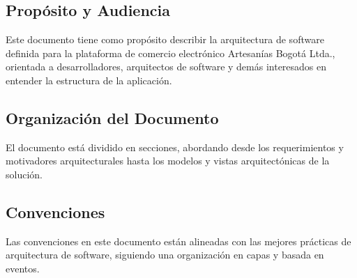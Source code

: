\documentclass[12pt]{article}
\begin{document}
\subsection{Propósito y Audiencia}
Este documento tiene como propósito describir la arquitectura de software definida para la plataforma de comercio electrónico Artesanías Bogotá Ltda., orientada a desarrolladores, arquitectos de software y demás interesados en entender la estructura de la aplicación.

\subsection{Organización del Documento}
El documento está dividido en secciones, abordando desde los requerimientos y motivadores arquitecturales hasta los modelos y vistas arquitectónicas de la solución.

\subsection{Convenciones}
Las convenciones en este documento están alineadas con las mejores prácticas de arquitectura de software, siguiendo una organización en capas y basada en eventos.
\end{document}

